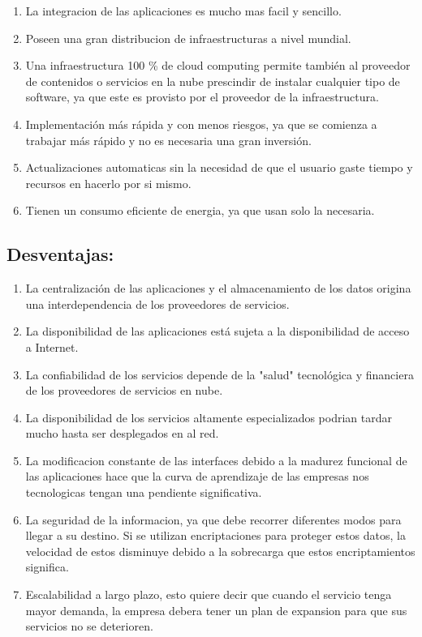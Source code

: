 \documentclass[12pt,letterpaper]{article}
\begin{document}
\begin{enumerate}
\item La integracion de las aplicaciones es mucho mas facil y sencillo.
\item Poseen una gran distribucion de infraestructuras a nivel mundial.
\item Una infraestructura 100 \% de cloud computing permite también al proveedor de contenidos o servicios en la nube prescindir de instalar cualquier tipo de software, ya que este es provisto por el proveedor de la infraestructura.
\item Implementación más rápida y con menos riesgos, ya que se comienza a trabajar más rápido y no es necesaria una gran inversión.
\item Actualizaciones automaticas sin la necesidad de que el usuario gaste tiempo y recursos en hacerlo por si mismo.
\item Tienen un consumo eficiente de energia, ya que usan solo la necesaria.
\end{enumerate}

\subsection{Desventajas:}
\begin{enumerate}
\item La centralización de las aplicaciones y el almacenamiento de los datos origina una interdependencia de los proveedores de servicios.
\item La disponibilidad de las aplicaciones está sujeta a la disponibilidad de acceso a Internet.
\item La confiabilidad de los servicios depende de la "salud" tecnológica y financiera de los proveedores de servicios en nube.
\item La disponibilidad de los servicios altamente especializados podrian tardar mucho hasta ser desplegados en al red.
\item La modificacion constante de las interfaces debido a la madurez funcional de las aplicaciones hace  que la curva de aprendizaje de las empresas nos tecnologicas tengan una pendiente significativa.
\item La seguridad de la informacion, ya que debe recorrer diferentes modos para llegar a su destino. Si se utilizan encriptaciones para proteger estos datos, la velocidad de estos disminuye debido a la sobrecarga que estos encriptamientos significa.
\item Escalabilidad a largo plazo, esto quiere decir que cuando el servicio tenga mayor demanda, la empresa debera tener un plan de expansion para que sus servicios no se deterioren.
	\end{enumerate}	
	
\end{document}
